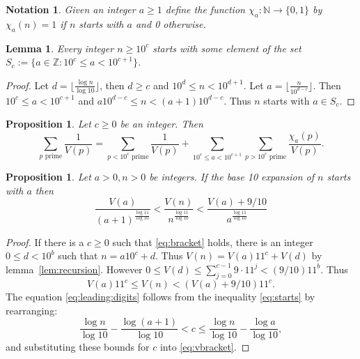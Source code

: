 \documentclass{article}
\newtheorem{lemma}[section]{Lemma}
\newtheorem{proposition}[section]{Proposition}
\newtheorem{notation}[section]{Notation}
\newcommand{\lemref}[1]{lemma~\ref{lem:#1}}
\newcommand{\ZZ}{\mathbb{Z}}
\newcommand{\NN}{\mathbb{N}}
\begin{document}
\begin{notation}
  \label{not:starts}
  Given an integer $a \ge 1$ define the function $\chi_a: \NN
  \rightarrow \{0,1\}$ by $\chi_a(n) = 1$ if $n$ starts with $a$ and 0
  otherwise.
\end{notation}
\begin{lemma}
  \label{lem:covering}
  Every integer $n \ge 10^c$ starts with some element of the set
  $S_c := \{a \in \ZZ: 10^c \le a < 10^{c+1}\}$.
\end{lemma}
\begin{proof}
  Let $d = \lfloor \frac{\log n }{\log 10}\rfloor$,
  then $d \ge c$ and $10^d \le n < 10^{d+1}$. Let
  $a = \lfloor \frac{n}{10^{d-c}} \rfloor$. Then
  $10^c \le a < 10^{c+1}$ and
  $a 10^{d-c} \le n < (a+1) 10^{d-c}$. Thus $n$ starts with $a \in S_c$.
\end{proof}
\begin{proposition}
  \label{prop:expansion}
  Let $c \ge 0$ be an integer. Then
  \begin{equation}
    \label{eq:decomposition}
    \sum_{p \text{ prime}} \frac{1}{V(p)} =
    \sum_{p < 10^c \text{ prime}} \frac{1}{V(p)} +
    \sum_{10^c \le a < 10^{c+1}} \sum_{p > 10^c \text{ prime}} \frac{\chi_a(p)}{V(p)}.
  \end{equation}
\end{proposition}
\begin{proposition}
  \label{prop:bounds}
  Let $a > 0, n > 0$ be integers. If the base 10 expansion of
  $n$ starts with $a$
  then
  \begin{equation}
    \label{eq:leading:digits}
    \frac{V(a)}{(a+1)^{\frac{\log 11}{\log 10}}}
      < \frac{V(n)}{n^{\frac{\log 11}{\log 10}}} < 
      \frac{V(a) + 9/10}{a^{\frac{\log 11}{\log 10}}}
  \end{equation}
\end{proposition}
\begin{proof}
  If there is a $c \ge 0 $ such that \eqref{eq:bracket} holds, there is an integer $0 \le d < 10^b$
  such that $n = a 10^c + d$. Thus $V(n) = V(a) 11^c + V(d)$ by
  \lemref{recursion}. However $0 \le V(d) \le \sum_{j=0}^{c-1} 9 \cdot
  11^j < (9/10) 11^b$.
  Thus
  \begin{equation}
    \label{eq:vbracket}
    V(a) 11^c \le V(n) < (V(a) + 9/10)11^c.
  \end{equation}
  The equation \eqref{eq:leading:digits} follows from the inequality
  \eqref{eq:starts} by rearranging:
  \begin{displaymath}
    \frac{\log n}{\log 10} - \frac{\log(a+1)}{\log 10} < c
    \le \frac{\log n}{\log 10} - \frac{\log a}{\log 10},
  \end{displaymath}
  and substituting these bounds for $c$ into \eqref{eq:vbracket}.
\end{proof}
\end{document}
